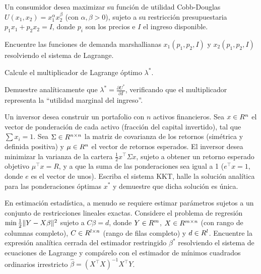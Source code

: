 \begin{exercise}\label{v1:ejer:2.23}
 Un consumidor desea maximizar su función de utilidad Cobb-Douglas $U(x_1, x_2) = x_1^\alpha x_2^\beta$ (con $\alpha, \beta > 0$), sujeto a su restricción presupuestaria $p_1 x_1 + p_2 x_2 = I$, donde $p_i$ son los precios e $I$ el ingreso disponible.
 \begin{enuthm}
 \item Encuentre las funciones de demanda marshallianas $x_1(p_1, p_2, I)$ y $x_2(p_1, p_2, I)$ resolviendo el sistema de Lagrange.
 \item Calcule el multiplicador de Lagrange óptimo $\lambda^*$.
 \item Demuestre analíticamente que $\lambda^* = \frac{\partial U^*}{\partial I}$, verificando que el multiplicador representa la ``utilidad marginal del ingreso''.
 \end{enuthm}
\end{exercise}

\begin{exercise}\label{v1:ejer:2.24}
 Un inversor desea construir un portafolio con $n$ activos financieros. Sea $x \in R^n$ el vector de ponderación de cada activo (fracción del capital invertido), tal que $\sum x_i = 1$. Sea $\Sigma \in R^{n \times n}$ la matriz de covarianza de los retornos (simétrica y definida positiva) y $\mu \in R^n$ el vector de retornos esperados. El inversor desea minimizar la varianza de la cartera $\frac{1}{2} x^\top \Sigma x$, sujeto a obtener un retorno esperado objetivo $\mu^\top x = R$, y a que la suma de las ponderaciones sea igual a 1 ($e^\top x = 1$, donde $e$ es el vector de unos). Escriba el sistema KKT, halle la solución analítica para las ponderaciones óptimas $x^*$ y demuestre que dicha solución es única.
\end{exercise}

\begin{exercise}\label{v1:ejer:2.25}
 En estimación estadística, a menudo se requiere estimar parámetros sujetos a un conjunto de restricciones lineales exactas. Considere el problema de regresión $\min \frac{1}{2} \lVert Y - X\beta\rVert^2$ sujeto a $C\beta = d$, donde $Y \in R^m$, $X \in R^{m \times n}$ (con rango de columnas completo), $C \in R^{l \times n}$ (rango de filas completo) y $d \in R^l$. Encuentre la expresión analítica cerrada del estimador restringido $\beta^*$ resolviendo el sistema de ecuaciones de Lagrange y compárelo con el estimador de mínimos cuadrados ordinarios irrestricto $\hat{\beta} = (X^\top X)^{-1}X^\top Y$.
\end{exercise}

